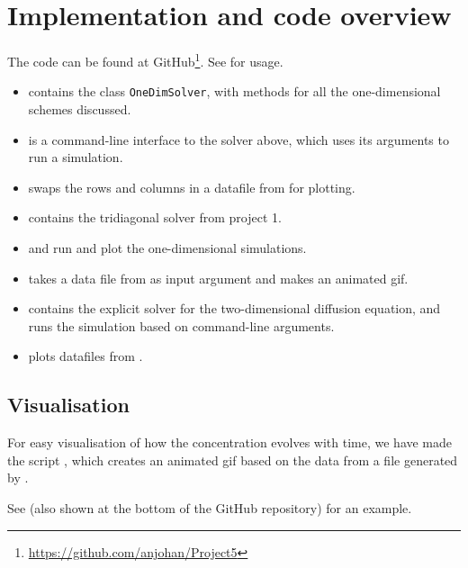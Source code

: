 \section{Implementation and code overview}
The code can be found at GitHub\footnote{\url{https://github.com/anjohan/Project5}}. See  for usage.

\begin{itemize}
\item {} contains the class \texttt{OneDimSolver}, with methods for all the one-dimensional schemes discussed.
\item {} is a command-line interface to the solver above, which uses its arguments to run a simulation.
\item {} swaps the rows and columns in a datafile from  for plotting.
\item {} contains the tridiagonal solver from project 1.
\item {} and  run and plot the one-dimensional simulations.
\item {} takes a data file from  as input argument and makes an animated gif.
\item {} contains the explicit solver for the two-dimensional diffusion equation, and runs the simulation based on command-line arguments.
\item {} plots datafiles from .
\end{itemize}

\subsection{Visualisation}
For easy visualisation of how the concentration evolves with time, we have made the script , which creates an animated gif based on the data from a file generated by .

See  (also shown at the bottom of the GitHub repository) for an example.
